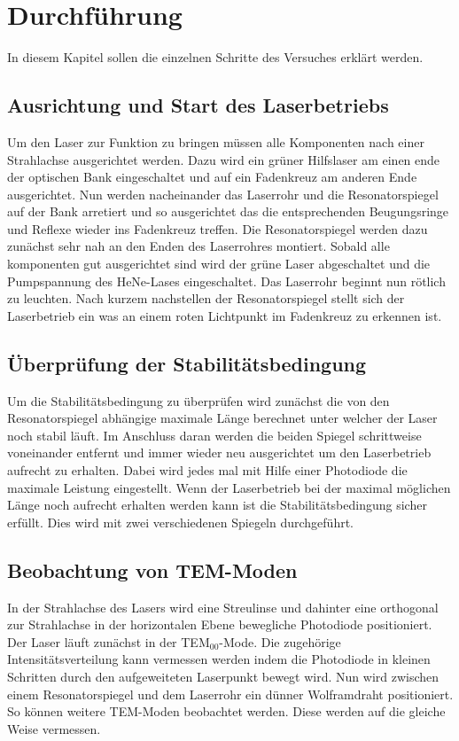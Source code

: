 \section{Durchführung}
\label{sec:Durchfuehrung}
In diesem Kapitel sollen die einzelnen Schritte des Versuches erklärt werden.
\subsection{Ausrichtung und Start des Laserbetriebs}
\label{sec:ausrichtung}
Um den Laser zur Funktion zu bringen müssen alle Komponenten nach einer Strahlachse ausgerichtet werden.
Dazu wird ein grüner Hilfslaser am einen ende der optischen Bank eingeschaltet und auf ein Fadenkreuz 
am anderen Ende ausgerichtet. Nun werden nacheinander das Laserrohr und die Resonatorspiegel auf der
Bank arretiert und so ausgerichtet das die entsprechenden Beugungsringe und Reflexe wieder ins Fadenkreuz 
treffen. Die Resonatorspiegel werden dazu zunächst sehr nah an den Enden des Laserrohres montiert.
Sobald alle komponenten gut ausgerichtet sind wird der grüne Laser abgeschaltet und die Pumpspannung des 
HeNe-Lases eingeschaltet. Das Laserrohr beginnt nun rötlich zu leuchten. Nach kurzem nachstellen der 
Resonatorspiegel stellt sich der Laserbetrieb ein was an einem roten Lichtpunkt im Fadenkreuz zu erkennen ist.

\subsection{Überprüfung der Stabilitätsbedingung}
\label{sec:stabilitaetsbedingung}
Um die Stabilitätsbedingung zu überprüfen wird zunächst die von den Resonatorspiegel abhängige maximale 
Länge berechnet unter welcher der Laser noch stabil läuft. Im Anschluss daran werden die beiden Spiegel 
schrittweise voneinander entfernt und immer wieder neu ausgerichtet um den Laserbetrieb aufrecht zu erhalten.
Dabei wird jedes mal mit Hilfe einer Photodiode die maximale Leistung eingestellt.
Wenn der Laserbetrieb bei der maximal möglichen Länge noch aufrecht erhalten werden kann ist die 
Stabilitätsbedingung sicher erfüllt. Dies wird mit zwei verschiedenen Spiegeln durchgeführt.

\subsection{Beobachtung von TEM-Moden}
\label{sec:temmoden}
In der Strahlachse des Lasers wird eine Streulinse und dahinter eine orthogonal zur Strahlachse in der 
horizontalen Ebene bewegliche Photodiode positioniert. Der Laser läuft zunächst in der TEM$_{00}$-Mode. 
Die zugehörige Intensitätsverteilung kann vermessen werden indem die Photodiode in kleinen Schritten durch 
den aufgeweiteten Laserpunkt bewegt wird. Nun wird zwischen einem Resonatorspiegel und dem Laserrohr ein
dünner Wolframdraht positioniert. So können weitere TEM-Moden beobachtet werden. Diese werden auf die gleiche
Weise vermessen.

